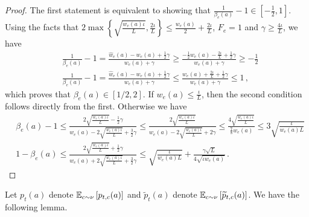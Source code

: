 \begin{proof}
The first statement is equivalent to showing that $\frac{1}{\beta_{e}(a)}-1 \in [-\frac{1}{2},1]$.
Using the facts that $2\max\left\{\sqrt{\frac{w_{e}(a)\iota}{L}},\frac{2\iota}{L}\right\}\le \frac{w_e(a)}{2}+\frac{2\iota}{L}$, $F_e = 1$ and $\gamma\geq \frac{4\iota}{L}$, we have
\begin{align*}
    &\frac{1}{\beta_{e}(a)}-1 = \frac{\widehat{w}_{e}(a)-w_{e}(a)+\frac{1}{2}\gamma}{w_e(a)+\gamma}\geq \frac{-\frac{1}{2}w_e(a)-\frac{2\iota}{L}+\frac{1}{2}\gamma}{w_e(a)+\gamma}\geq -\frac{1}{2}\\
    &\frac{1}{\beta_{e}(a)}-1 = \frac{\widehat{w}_{e}(a)-w_{e}(a)+\frac{1}{2}\gamma}{w_e(a)+\gamma}\le \frac{w_e(a)+\frac{2\iota}{L}+\frac{1}{2}\gamma}{w_e(a)+\gamma}\le 1\,,
\end{align*}
which proves that $\beta_{e}(a)\in[1/2,2]$.
If $w_{e}(a)\le \frac{\iota}{L}$, then the second condition follows directly from the first. Otherwise we have
\begin{align*}
    &\beta_{e}(a)-1 \le \frac{ 2\sqrt{\frac{w_{e}(a)\iota}{L}}-\frac{1}{2}\gamma}{w_{e}(a)-2\sqrt{\frac{w_{e}(a)\iota}{L}}+\frac{3}{2}\gamma} \le \frac{ 2\sqrt{\frac{w_{e}(a)\iota}{L}}}{w_{e}(a)-2\sqrt{\frac{w_{e}(a)\iota}{L}}+2\gamma}\le \frac{ 4\sqrt{\frac{w_{e}(a)\iota}{L}}}{\frac{7}{8}w_{e}(a)}\le 3\sqrt{\frac{\iota}{w_{e}(a)L}}\\
    &1-\beta_{e}(a) \le \frac{ 2\sqrt{\frac{w_{e}(a)\iota}{L}}+\frac{1}{2}\gamma}{w_{e}(a)+2\sqrt{\frac{w_{e}(a)\iota}{L}}+\frac{3}{2}\gamma} \le \sqrt{\frac{\iota}{w_{e}(a)L}}+\frac{\gamma\sqrt{L}}{4\sqrt{\iota w_{e}(a)}}\,.
\end{align*}
\end{proof}

Let $p_t(a)$ denote $\mathbb{E}_{c \sim \nu}\left[p_{t,c}(a)\right]$ and $\widetilde{p}_t(a)$ denote $\mathbb{E}_{c \sim \nu}\left[\widetilde{p}_{t,c}(a)\right]$. We have the following lemma.


